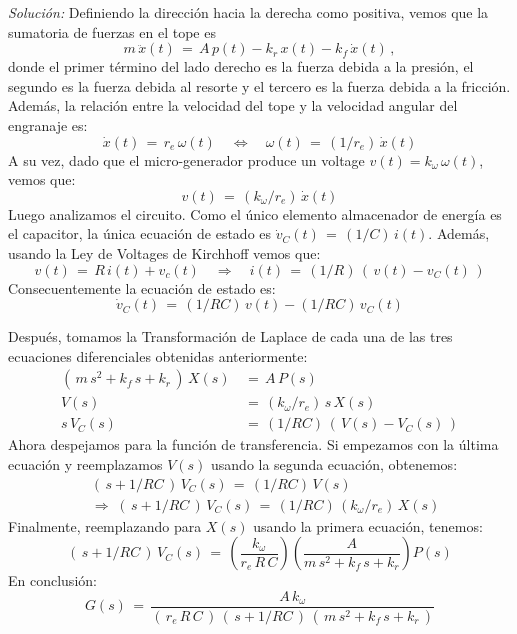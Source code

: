 \documentclass[ a4paper, twoside, 11pt]{article}
\begin{document}
\begin{problem}
\emph{Soluci\'on:} Definiendo la direcci\'on hacia la derecha como positiva, vemos que la sumatoria de fuerzas en el tope es 
\begin{equation}
m \, \ddot{x}(t) \, = \, 
A \, p(t) - k_r \, x(t) - k_f \, \dot{x}(t) \, ,
\label{eq:mecanico}
\end{equation}
donde el primer t\'ermino del lado derecho es la fuerza debida a la presi\'on, el segundo es la fuerza debida al resorte y el tercero es la fuerza debida a la fricci\'on. Adem\'as, la relaci\'on entre la velocidad del tope y la velocidad angular del engranaje es: 
\[
\dot{x}(t) \, = \, r_e \, \omega(t) \quad \Longleftrightarrow \quad
\omega(t) \, = \, (1/r_e) \, \dot{x}(t)
\]
A su vez, dado que el micro-generador produce un voltage $v(t) = k_\omega \, \omega(t)$, vemos que: 
\begin{equation}
v(t) \, = \, (k_\omega/r_e) \, \dot{x}(t)
\label{eq:engranaje}
\end{equation}
Luego analizamos el circuito. Como el \'unico elemento almacenador de energ\'ia es el capacitor, la \'unica ecuaci\'on de estado es $\dot{v}_C(t) \, = \, (1/C) \, i(t)$. Adem\'as, usando la Ley de Voltages de Kirchhoff vemos que: 
\[
v(t) \, = \, R \, i(t) + v_c(t) \quad \Longrightarrow \quad
i(t) \, = \, (1/R) \, ( \, v(t) - v_C(t) \, )
\]
Consecuentemente la ecuaci\'on de estado es: 
\begin{equation}
\dot{v}_C(t) \, = \, (1/RC) \, v(t) - (1/RC) \, v_C(t)
\label{eq:electrico}
\end{equation}

Despu\'es, tomamos la Transformaci\'on de Laplace de cada una de las tres ecuaciones diferenciales obtenidas anteriormente: 
\begin{align}
( \, m \, s^2 + k_f \, s + k_r \, ) \, X(s) \, 
& = \, A \, P(s) \\
V(s) \, & = \, (k_\omega/r_e) \, s \, X(s) \\
s \, V_C(s) \, & = \, (1/RC) \, ( \, V(s) - V_C(s) \, )
\end{align}
Ahora despejamos para la funci\'on de transferencia. Si empezamos con la \'ultima ecuaci\'on y reemplazamos $V(s)$ usando la segunda ecuaci\'on, obtenemos: 
\begin{align*}
& ( \, s + 1/RC \, ) \, V_C(s) \, = \, (1/RC) \, V(s)  \\
& \Longrightarrow \;
( \, s + 1/RC \, ) \, V_C(s) \, = \, (1/RC) \, (k_\omega/r_e) \, X(s)
\end{align*}
Finalmente, reemplazando para $X(s)$ usando la primera ecuaci\'on, tenemos: 
\[
( \, s + 1/RC \, ) \, V_C(s) \, = \,
\left( \frac{k_\omega}{r_e \, R \, C} \right)
\left( \frac{A}{m \, s^2 + k_f \, s + k_r} \right) P(s)
\]
En conclusi\'on: 
\[
G(s) \, = \, 
\frac{A \, k_\omega}{ ( \, r_e \, R \, C \, ) \, ( \, s + 1/RC \, ) \, ( \, m \, s^2 + k_f \, s + k_r \, )}
\]

\end{problem}
\vspace{\baselineskip}
\end{document}
